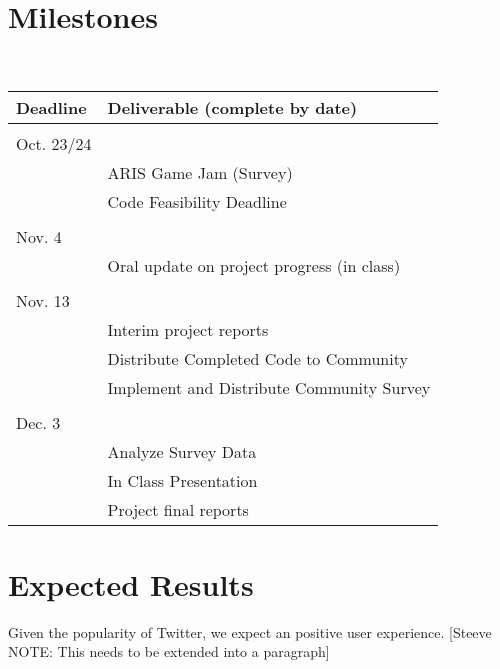 \documentclass{sigchi}
\begin{document}
\section{Milestones}
\hfill \\
\begin{tabular}{l |l}
\large{Deadline}  & \large{Deliverable (complete by date)} \\
\hline \\
Oct. 23/24 &                                                                        \\
           & ARIS Game Jam (Survey)                                                 \\
           & Code Feasibility Deadline  \\
\hline \\
Nov. 4     &\\
            & Oral update on project progress (in class)                             \\
\hline \\
Nov. 13    &                                                                        \\
           & Interim project reports                                                \\
           & Distribute Completed Code to Community                                 \\
           & Implement and Distribute Community Survey                              \\
\hline \\
Dec. 3     &                                                                        \\
           & Analyze Survey Data                                                    \\
           & In Class Presentation                                                  \\
           & Project final reports                                                 
\end{tabular}

\section{Expected Results}
Given the popularity of Twitter, we expect an positive user experience. [Steeve NOTE: This needs to be extended into a paragraph]
\end{document}
